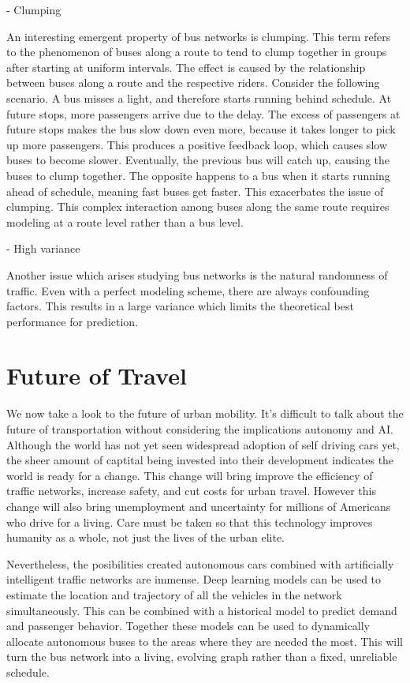 - Clumping

An interesting emergent property of bus networks is clumping.
This term refers to the phenomenon of buses along a route to tend to clump together in groups after starting at uniform intervals.
The effect is caused by the relationship between buses along a route and the respective riders.
Consider the following scenario.
A bus misses a light, and therefore starts running behind schedule.
At future stops, more passengers arrive due to the delay.
The excess of passengers at future stops makes the bus slow down even more, because it takes longer to pick up more passengers.
This produces a positive feedback loop, which causes slow buses to become slower.
Eventually, the previous bus will catch up, causing the buses to clump together.
The opposite happens to a bus when it starts running ahead of schedule, meaning fast buses get faster.
This exacerbates the issue of clumping.
This complex interaction among buses along the same route requires modeling at a route level rather than a bus level.

- High variance

Another issue which arises studying bus networks is the natural randomness of traffic.
Even with a perfect modeling scheme, there are always confounding factors.
This results in a large variance which limits the theoretical best performance for prediction.

\section{Future of Travel}

We now take a look to the future of urban mobility.
It's difficult to talk about the future of transportation without considering the implications autonomy and AI.
Although the world has not yet seen widespread adoption of self driving cars yet, the sheer amount of captital being invested into their development indicates the world is ready for a change.
This change will bring improve the efficiency of traffic networks, increase safety, and cut costs for urban travel.
However this change will also bring unemployment and uncertainty for millions of Americans who drive for a living.
Care must be taken so that this technology improves humanity as a whole, not just the lives of the urban elite.

Nevertheless, the posibilities created autonomous cars combined with artificially intelligent traffic networks are immense.
Deep learning models can be used to estimate the location and trajectory of all the vehicles in the network simultaneously.
This can be combined with a historical model to predict demand and passenger behavior.
Together these models can be used to dynamically allocate autonomous buses to the areas where they are needed the most.
This will turn the bus network into a living, evolving graph rather than a fixed, unreliable schedule.

